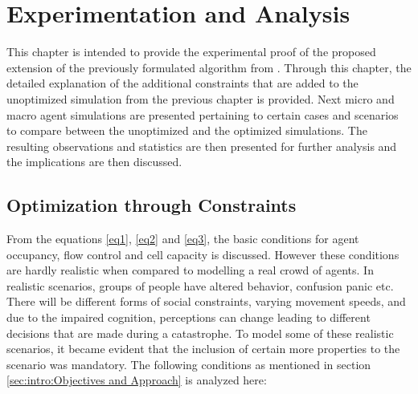  \chapter{Experimentation and Analysis\label{ch:Experimentation and Analysis}}

This chapter is intended to provide the experimental proof of the proposed extension of the previously formulated algorithm from \cite{ref5}. Through this chapter, the detailed explanation of the additional constraints that are added to the unoptimized simulation from the previous chapter is provided. Next micro and macro agent simulations are presented pertaining to certain cases and scenarios to compare between the unoptimized and the optimized simulations. The resulting observations and statistics are then presented for further analysis and the implications are then discussed.

\section{Optimization through Constraints}
\label{sec: Optimization through Constraints}

From the equations \ref{eq1}, \ref{eq2} and \ref{eq3}, the basic conditions for agent occupancy, flow control and cell capacity is discussed. However these conditions are hardly realistic when compared to modelling a real crowd of agents. In realistic scenarios, groups of people have altered behavior, confusion panic etc. There will be different forms of social constraints, varying movement speeds, and due to the impaired cognition, perceptions can change leading to different decisions that are made during a catastrophe. To model some of these realistic scenarios, it became evident that the inclusion of certain more properties to the scenario was mandatory. The following conditions as mentioned in section \ref{sec:intro:Objectives and Approach} is analyzed here:


